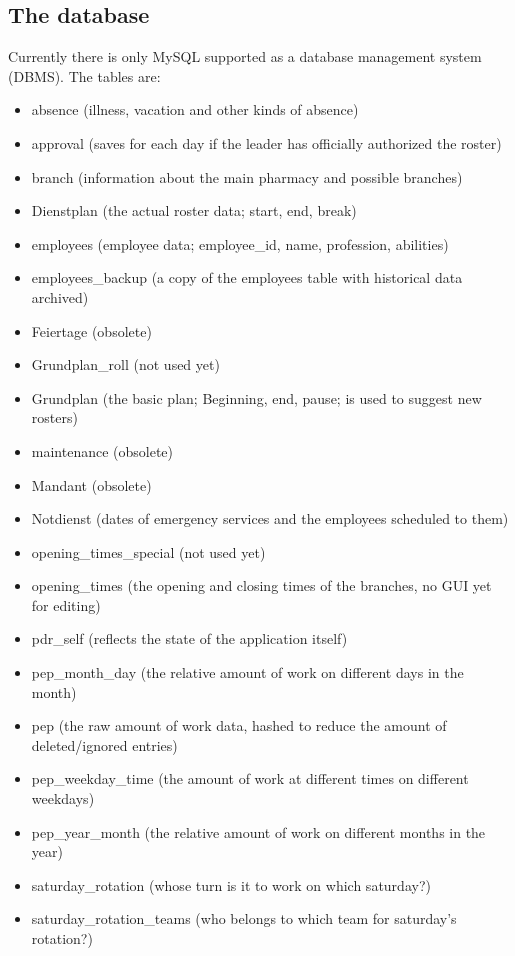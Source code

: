 \subsection{The database}
Currently there is only MySQL supported as a database management system (DBMS).
The tables are:
\begin{itemize}
\item absence (illness, vacation and other kinds of absence)
\item approval (saves for each day if the leader has officially authorized the roster)
\item branch (information about the main pharmacy and possible branches)
\item Dienstplan (the actual roster data; start, end, break)
\item employees (employee data; employee\_id, name, profession, abilities)
\item employees\_backup (a copy of the employees table with historical data archived)
\item Feiertage (obsolete)
\item Grundplan\_roll (not used yet)
\item Grundplan (the basic plan; Beginning, end, pause; is used to suggest new rosters)
\item maintenance (obsolete)
\item Mandant (obsolete)
\item Notdienst (dates of emergency services and the employees scheduled to them)
\item opening\_times\_special (not used yet)
\item opening\_times (the opening and closing times of the branches, no GUI yet for editing)
\item pdr\_self (reflects the state of the application itself)
\item pep\_month\_day (the relative amount of work on different days in the month)
\item pep (the raw amount of work data, hashed to reduce the amount of deleted/ignored entries)
\item pep\_weekday\_time (the amount of work at different times on different weekdays)
\item pep\_year\_month (the relative amount of work on different months in the year)
\item saturday\_rotation (whose turn is it to work on which saturday?)
\item saturday\_rotation\_teams (who belongs to which team for saturday's rotation?)

\end{itemize}
